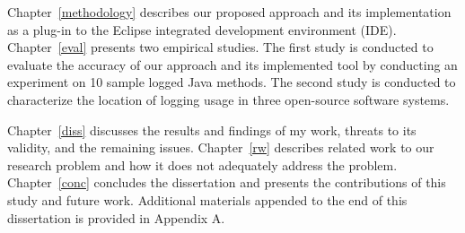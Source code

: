 Chapter~\ref{methodology} describes our proposed approach and its implementation as a plug-in to the Eclipse integrated development environment (IDE). Chapter~\ref{eval} presents two empirical studies. The first study is conducted to evaluate the accuracy of our approach and its implemented tool by conducting an experiment on 10 sample logged Java methods. The second study is conducted to characterize the location of logging usage in three open-source software systems. 

Chapter~\ref{diss} discusses the results and findings of my work, threats to its validity, and the remaining issues. Chapter~\ref{rw} describes related work to our research problem and how it does not adequately address the problem. Chapter~\ref{conc} concludes the dissertation and presents the contributions of this study and future work. Additional materials appended to the end of this dissertation is provided in Appendix A.



